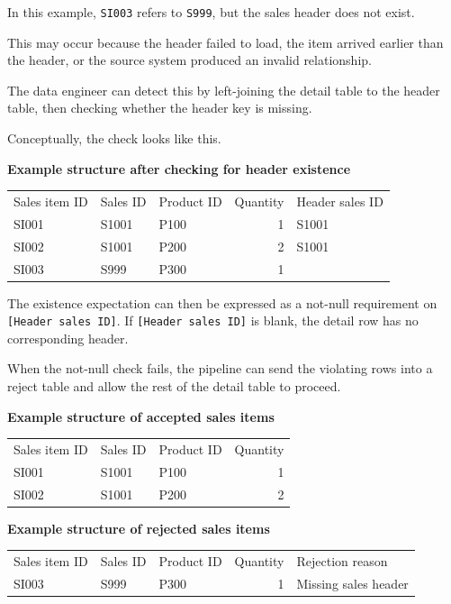 \documentclass[10pt,openany,10pt]{book}
\newcounter{none}
\let\podeToprule\toprule
\let\podeMidrule\midrule
\let\podeBottomrule\bottomrule
\renewcommand{\toprule}{\arrayrulecolor{pbiGrid}\podeToprule}
\renewcommand{\midrule}{\arrayrulecolor{pbiGrid}\podeMidrule}
\renewcommand{\bottomrule}{\arrayrulecolor{pbiGrid}\podeBottomrule}
\begin{document}
In this example, \texttt{SI003} refers to \texttt{S999}, but the sales
header does not exist.

This may occur because the header failed to load, the item arrived
earlier than the header, or the source system produced an invalid
relationship.

The data engineer can detect this by left-joining the detail table to
the header table, then checking whether the header key is missing.

Conceptually, the check looks like this.

\textbf{Example structure after checking for header existence}

{\def\LTcaptype{none} %
\begin{longtable}[]{@{}lllrl@{}}
\toprule\noalign{}
Sales item ID & Sales ID & Product ID & Quantity & Header sales ID \\
\midrule\noalign{}
\endhead
\bottomrule\noalign{}
\endlastfoot
SI001 & S1001 & P100 & 1 & S1001 \\
SI002 & S1001 & P200 & 2 & S1001 \\
SI003 & S999 & P300 & 1 & \\
\end{longtable}
}

The existence expectation can then be expressed as a not-null
requirement on \texttt{{[}Header\ sales\ ID{]}}. If
\texttt{{[}Header\ sales\ ID{]}} is blank, the detail row has no
corresponding header.

When the not-null check fails, the pipeline can send the violating rows
into a reject table and allow the rest of the detail table to proceed.

\textbf{Example structure of accepted sales items}

{\def\LTcaptype{none} %
\begin{longtable}[]{@{}lllr@{}}
\toprule\noalign{}
Sales item ID & Sales ID & Product ID & Quantity \\
\midrule\noalign{}
\endhead
\bottomrule\noalign{}
\endlastfoot
SI001 & S1001 & P100 & 1 \\
SI002 & S1001 & P200 & 2 \\
\end{longtable}
}

\textbf{Example structure of rejected sales items}

{\def\LTcaptype{none} %
\begin{longtable}[]{@{}lllrl@{}}
\toprule\noalign{}
Sales item ID & Sales ID & Product ID & Quantity & Rejection reason \\
\midrule\noalign{}
\endhead
\bottomrule\noalign{}
\endlastfoot
SI003 & S999 & P300 & 1 & Missing sales header \\
\end{longtable}
}
\end{document}
